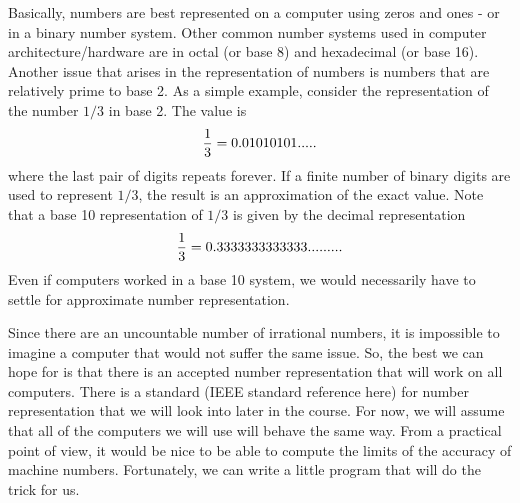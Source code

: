 \documentclass[10pt,fleqn]{article}
\begin{document}
Basically, numbers are best represented on a computer using zeros and ones -
or in a binary number system. Other common number systems used in computer
architecture/hardware are in octal (or base 8) and hexadecimal (or base 16).
Another issue that arises in the representation of numbers is numbers that are
relatively prime to base 2. As a simple example, consider the representation of
the number $1/3$ in base 2.  The value is
$${1\over 3} = 0.01010101.....$$
where the last pair of digits repeats forever. If a finite number of binary
digits are used to represent $1/3$, the result is an approximation of the exact
value. Note that a base 10 representation of $1/3$ is given by the decimal
representation
$${1\over 3} = 0.3333333333333.........$$
Even if computers worked in a base 10 system, we would necessarily have to
settle for approximate number representation.

Since there are an uncountable number of irrational numbers, it is impossible to
imagine a computer that would not suffer the same issue. So, the best we can
hope for is that there is an accepted number representation that will work on
all computers. There is a standard (IEEE standard reference here) for number
representation that we will look into later in the course. For now, we will
assume that all of the computers we will use will behave the same way. From a
practical point of view, it would be nice to be able to compute the limits of
the accuracy of machine numbers. Fortunately, we can write a little program that
will do the trick for us.
\end{document}
